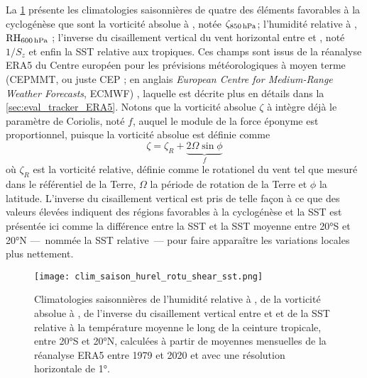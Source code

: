 \documentclass[../main.tex]{subfiles}
\begin{document}
La \cref{fig:clim_ingredients} présente les climatologies saisonnières de quatre des éléments favorables à la cyclogénèse que sont la vorticité absolue à
, notée $\zeta_{\text{\hPa{850}}}$; l'humidité relative à , $\text{RH}_{\text{\hPa{600}}}$ ; l'inverse du cisaillement vertical du vent
horizontal entre  et , noté $1/S_z$ et enfin la SST relative aux tropiques. Ces champs sont issus de la réanalyse ERA5 du Centre européen pour
les prévisions météorologiques à moyen terme (CEPMMT, ou juste CEP ; en anglais \textit{European Centre for Medium-Range Weather Forecasts}, ECMWF)
\parencite{hersbach_era5_2020}, laquelle est décrite plus en détails dans la \cref{sec:eval_tracker_ERA5}. Notons que la vorticité absolue $\zeta$ à  intègre
déjà le paramètre de Coriolis, noté $f$, auquel le module de la force éponyme est proportionnel, puisque la vorticité absolue est définie comme
%
\begin{equation*}
    \zeta = \zeta_R + \underbrace{2 \Omega \sin \phi}_{f}
\end{equation*}
%
où $\zeta_R$ est la vorticité relative, définie comme le rotationel du vent tel que mesuré dans le référentiel de la Terre, $\Omega$ la période de
rotation de la Terre et $\phi$ la latitude. L'inverse du cisaillement vertical est pris de telle façon à ce que des valeurs élevées indiquent des régions
favorables à la cyclogénèse et la SST est présentée ici comme la différence entre la SST et la SST moyenne entre \ang{20}S et \ang{20}N
---~nommée la SST relative~--- pour faire apparaître les variations locales plus nettement.

\begin{figure}[tp]
    \centering
    \texttt{[image: clim\_saison\_hurel\_rotu\_shear\_sst.png]}
    \caption{Climatologies saisonnières de l'humidité relative à , de la vorticité absolue à , de l'inverse du cisaillement vertical entre
     et  et de la SST relative à la température moyenne le long de la ceinture tropicale, entre \ang{20}S et \ang{20}N, calculées à partir de
    moyennes mensuelles de la réanalyse ERA5 entre 1979 et 2020 et avec une résolution horizontale de \ang{1}.}
    \label{fig:clim_ingredients}
\end{figure}
\end{document}
